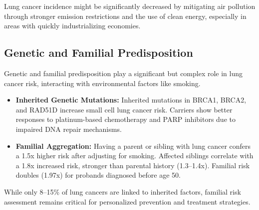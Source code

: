 Lung cancer incidence might be significantly decreased by mitigating air pollution through stronger 
emission restrictions and the use of clean energy, especially in areas with quickly industrializing 
economies.


\subsection{Genetic and Familial Predisposition}

Genetic and familial predisposition play a significant but complex role in lung cancer risk, 
interacting with environmental factors like smoking.

\begin{itemize}
    \item \textbf{Inherited Genetic Mutations:} Inherited mutations in BRCA1, BRCA2, and RAD51D 
    increase small cell lung cancer risk. Carriers show better responses to platinum-based 
    chemotherapy and PARP inhibitors due to impaired DNA repair mechanisms. 

    \item \textbf{Familial Aggregation:} Having a parent or sibling with lung cancer confers a 1.5x 
    higher risk after adjusting for smoking. Affected siblings correlate with a 1.8x increased risk, 
    stronger than parental history (1.3–1.4x). Familial risk doubles (1.97x) for probands diagnosed 
    before age 50. \cite{eur2012}
\end{itemize}

While only 8–15\% of lung cancers \cite{ol2017} are linked to inherited factors, familial risk 
assessment remains critical for personalized prevention and treatment strategies.


